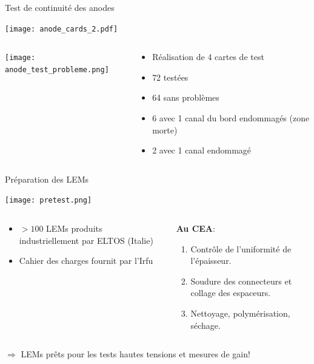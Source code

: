     \begin{frame}{Test de continuité des anodes}
        \begin{scriptsize}
            \texttt{[image: anode\_cards\_2.pdf]}
            \begin{columns}
                \begin{column}{0.65\textwidth}
                    \centering\texttt{[image: anode\_test\_probleme.png]}
                \end{column}
                \begin{column}{0.45\textwidth}
                    \begin{itemize}
                        \item Réalisation de 4 cartes de test
                        \item 72 testées
                        \item 64 sans problèmes
                        \item 6 avec 1 canal du bord endommagés (zone morte)
                        \item 2 avec 1 canal endommagé
                    \end{itemize}
                \end{column}\hfill
            \end{columns}
        \end{scriptsize}
    \end{frame}

    \begin{frame}{Préparation des LEMs}
    	\begin{scriptsize}
    		\begin{center}
		    	\texttt{[image: pretest.png]}
	    	\end{center}
	    	\begin{columns}
	    		\begin{column}{0.5\textwidth}
	    			\begin{itemize}
	    				\item $>100$ LEMs produits industriellement par ELTOS (Italie)
	    				\item Cahier des charges fournit par l'Irfu
	    			\end{itemize}
	    		\end{column}\hfill
	    		\begin{column}{0.5\textwidth}
	    			\textbf{\hspace{0.3cm}Au CEA}:
	    			\begin{enumerate}
	    				\item Contrôle de l'uniformité de l'épaisseur.
	    				\item Soudure des connecteurs et collage des espaceurs.
	    				\item Nettoyage, polymérisation, séchage.
	    			\end{enumerate}
	    		\end{column}
	    	\end{columns}
	    \end{scriptsize}
	    \vspace{0.5cm}
        $\Rightarrow$ LEMs prêts pour les tests hautes tensions et mesures de gain!
    \end{frame}

